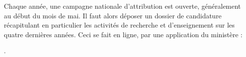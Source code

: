 

Chaque ann\'ee, une campagne nationale d'attribution est ouverte, g\'en\'eralement au d\'ebut du mois de mai. Il faut alors
d\'eposer un dossier de candidature r\'ecapitulant en particulier
les activit\'es  de recherche et d'enseignement sur les quatre derni\`eres ann\'ees. Ceci se fait en ligne, par une application du minist\`ere :

 . 
 

%

